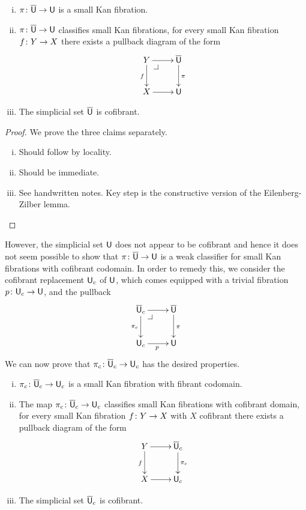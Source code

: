 \documentclass[reqno,10pt,a4paper,oneside,draft]{amsart}
\begin{document}
\begin{proposition} \label{thm:universe-u}  \hfill 
\begin{enumerate}[(i)] 
\item $\pi \colon \overline{\mathsf{U}} \to \mathsf{U}$ is a small Kan fibration.
\item $\pi \colon \overline{\mathsf{U}} \to \mathsf{U}$ classifies small Kan fibrations, \ie 
for every small Kan fibration $f \colon Y \to X$ there exists  a pullback diagram of the form
\[
\xymatrix{
Y \ar[r] \ar[d]_f \drpullback & \UU \ar[d]^\pi \\
X \ar[r] & \U }
\]
\item  The simplicial set $\overline{\mathsf{U}}$ is cofibrant.
\end{enumerate}
\end{proposition}

\begin{proof} We prove the three claims separately.
\begin{enumerate}[(i)] 
\item Should follow by locality.
\item Should be immediate.
\item See handwritten notes. Key step is the constructive version of the Eilenberg-Zilber lemma. \qedhere
\end{enumerate}
\end{proof} 

However, the simplicial set $\mathsf{U}$ does not appear to be cofibrant and hence it does not seem possible to show that  $\pi \colon \overline{\mathsf{U}} \to \mathsf{U}$ is a weak classifier for small Kan fibrations with cofibrant codomain. In order to remedy this, we consider the cofibrant replacement $\mathsf{U}_c$ of $\mathsf{U}$, which comes equipped
with a trivial fibration $p \colon \mathsf{U}_c \to \mathsf{U}$, and the pullback
\[
\xymatrix{
\UU_c \ar[d]_{\pi_c} \ar[r] \drpullback & \UU \ar[d]^{\pi}  \\
\U_c \ar[r]_p & \U}
\]
We can now prove that $\pi_c \colon \overline{\mathsf{U}}_c \to \mathsf{U}_c$ has the desired properties.


\begin{proposition} \label{thm:universe-uc} 
\hfill 
\begin{enumerate}[(i)] 
\item $\pi_c \colon \overline{\mathsf{U}}_c \to \mathsf{U}_c$ is a small Kan fibration with fibrant codomain. 
\item The map $\pi_c \colon \overline{\mathsf{U}}_c \to \mathsf{U}_c$ classifies small Kan fibrations with cofibrant domain, \ie 
for every small Kan fibration $f \colon Y \to X$ with $X$ cofibrant there exists  a pullback diagram of the form
\[
\xymatrix{
Y \ar[r] \ar[d]_f & \UU_c \ar[d]^{\pi_c} \\
X \ar[r] & \U_c }
\]
\item The simplicial set $\overline{\mathsf{U}}_c$ is cofibrant.
\end{enumerate}
\end{proposition}
\end{document}
